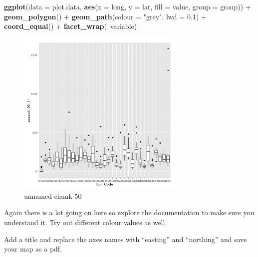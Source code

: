 \documentclass[]{article}
\newenvironment{Shaded}{}{}
\newcommand{\KeywordTok}[1]{\textcolor[rgb]{0.00,0.44,0.13}{\textbf{{#1}}}}
\newcommand{\DataTypeTok}[1]{\textcolor[rgb]{0.56,0.13,0.00}{{#1}}}
\newcommand{\FloatTok}[1]{\textcolor[rgb]{0.25,0.63,0.44}{{#1}}}
\newcommand{\StringTok}[1]{\textcolor[rgb]{0.25,0.44,0.63}{{#1}}}
\newcommand{\NormalTok}[1]{{#1}}
\begin{document}
\begin{Shaded}
\begin{Highlighting}[]
\KeywordTok{ggplot}\NormalTok{(}\DataTypeTok{data =} \NormalTok{plot.data, }\KeywordTok{aes}\NormalTok{(}\DataTypeTok{x =} \NormalTok{long, }\DataTypeTok{y =} \NormalTok{lat, }\DataTypeTok{fill =} \NormalTok{value, }\DataTypeTok{group =} \NormalTok{group)) + }
    \KeywordTok{geom_polygon}\NormalTok{() + }\KeywordTok{geom_path}\NormalTok{(}\DataTypeTok{colour =} \StringTok{"grey"}\NormalTok{, }\DataTypeTok{lwd =} \FloatTok{0.1}\NormalTok{) + }\KeywordTok{coord_equal}\NormalTok{() + }
    \KeywordTok{facet_wrap}\NormalTok{(~variable)}
\end{Highlighting}
\end{Shaded}
\begin{figure}[htbp]
\centering
\includegraphics[width=8cm]{figure/unnamed-chunk-50.png}
\caption{unnamed-chunk-50}
\end{figure}

Again there is a lot going on here so explore the documentation to make
sure you understand it. Try out different colour values as well.

Add a title and replace the axes names with ``easting'' and ``northing''
and save your map as a pdf.
\end{document}
